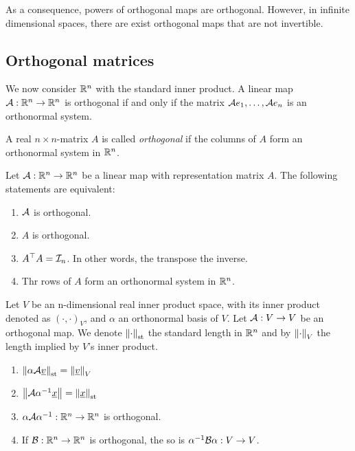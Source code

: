 \begin{remark}
    As a consequence, powers of orthogonal maps are orthogonal. However, in infinite dimensional spaces, there are exist orthogonal maps that are not invertible.
\end{remark}

\subsection{Orthogonal matrices}
\begin{corollary}
    We now consider $\mathbb{R}^n$ with the standard inner product. A linear map $\mathcal{A}: \mathbb{R}^n \to \mathbb{R}^n$ is orthogonal if and only if the matrix $\mathcal{A} e_1, \dots, \mathcal{A} e_n$ is an orthonormal system.
\end{corollary}

\begin{definition}
    A real $n \times n$-matrix $A$ is called \emph{orthogonal} if the columns of $A$ form an orthonormal system in $\mathbb{R}^n$.
\end{definition}

\begin{theorem}
    Let $\mathcal{A}: \mathbb{R}^n \to \mathbb{R}^n$ be a linear map with representation matrix $A$. The following statements are equivalent: 
    \begin{enumerate}
        \item $\mathcal{A}$ is orthogonal.
        \item $A$ is orthogonal.
        \item $A^\top A = \mathcal{I}_n$. In other words, the transpose the inverse.
        \item Thr rows of $A$ form an orthonormal system in $\mathbb{R}^n$.
    \end{enumerate}
\end{theorem}

\begin{lemma}
    Let $V$ be an n-dimensional real inner product space, with its inner product denoted as $(\cdot, \cdot)_V$, and $\alpha$ an orthonormal basis of $V$. 
    Let $\mathcal{A}:V \to V$ be an orthogonal map. We denote $\norm{\cdot}_\text{st}$ the standard length in $\mathbb{R}^n$ and by $\norm{\cdot}_V$ the length implied by $V$'s inner product.
    \begin{enumerate}
        \item $\norm{\alpha{\mathcal{A}\underline{v}}}_\text{st} = \norm{\underline{v}}_V$
        \item $\norm{\mathcal{A}\alpha^{-1}\underline{x}} = \norm{\underline{x}}_\text{st}$
        \item $\alpha \mathcal{A} \alpha^{-1}: \mathbb{R}^n \to \mathbb{R}^n$ is orthogonal.
        \item If $\mathcal{B}: \mathbb{R}^n \to \mathbb{R}^n$ is orthogonal, the so is $\alpha^{-1}\mathcal{B}\alpha:V \to V$.
    \end{enumerate}
\end{lemma}

